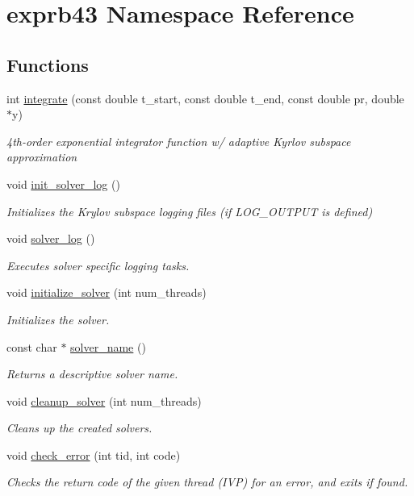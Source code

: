 \hypertarget{namespaceexprb43}{}\section{exprb43 Namespace Reference}
\label{namespaceexprb43}
\subsection*{Functions}
\begin{DoxyCompactItemize}
\item 
int \hyperlink{namespaceexprb43_a67d60af836938be17821d7ca32fa31fa}{integrate} (const double t\+\_\+start, const double t\+\_\+end, const double pr, double $\ast$y)
\begin{DoxyCompactList}\small\item\em 4th-\/order exponential integrator function w/ adaptive Kyrlov subspace approximation \end{DoxyCompactList}\item 
void \hyperlink{namespaceexprb43_adb214180d920bd67592be89b6264aa90}{init\+\_\+solver\+\_\+log} ()
\begin{DoxyCompactList}\small\item\em Initializes the Krylov subspace logging files (if L\+O\+G\+\_\+\+O\+U\+T\+P\+UT is defined) \end{DoxyCompactList}\item 
void \hyperlink{namespaceexprb43_ad02d94a3cc25e03cf47a6903559f4262}{solver\+\_\+log} ()
\begin{DoxyCompactList}\small\item\em Executes solver specific logging tasks. \end{DoxyCompactList}\item 
void \hyperlink{namespaceexprb43_a923d03974bd3461619b71ac8fb34abd8}{initialize\+\_\+solver} (int num\+\_\+threads)
\begin{DoxyCompactList}\small\item\em Initializes the solver. \end{DoxyCompactList}\item 
const char $\ast$ \hyperlink{namespaceexprb43_a5357a692b80a08edee50c4073763422b}{solver\+\_\+name} ()
\begin{DoxyCompactList}\small\item\em Returns a descriptive solver name. \end{DoxyCompactList}\item 
void \hyperlink{namespaceexprb43_ad7bbc3b8b5f2627e89908cdec0750523}{cleanup\+\_\+solver} (int num\+\_\+threads)
\begin{DoxyCompactList}\small\item\em Cleans up the created solvers. \end{DoxyCompactList}\item 
void \hyperlink{namespaceexprb43_aa165b73c13e21b53f0713c4c5ec5fd7c}{check\+\_\+error} (int tid, int code)
\begin{DoxyCompactList}\small\item\em Checks the return code of the given thread (I\+VP) for an error, and exits if found. \end{DoxyCompactList}\end{DoxyCompactItemize}


